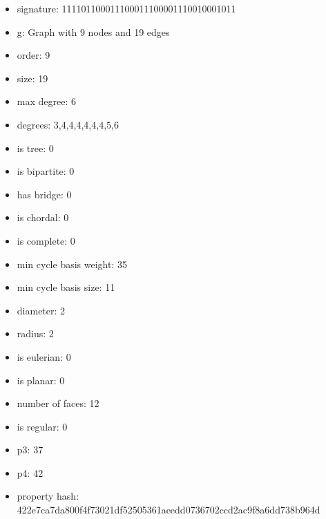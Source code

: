 \newpage
\begin{figure}
\end{figure}
\begin{itemize}
\item signature: 111101100011100011100001110010001011
\item g: Graph with 9 nodes and 19 edges
\item order: 9
\item size: 19
\item max degree: 6
\item degrees: 3,4,4,4,4,4,4,5,6
\item is tree: 0
\item is bipartite: 0
\item has bridge: 0
\item is chordal: 0
\item is complete: 0
\item min cycle basis weight: 35
\item min cycle basis size: 11
\item diameter: 2
\item radius: 2
\item is eulerian: 0
\item is planar: 0
\item number of faces: 12
\item is regular: 0
\item p3: 37
\item p4: 42
\item property hash: 422e7ca7da800f4f73021df52505361aeedd0736702ccd2ac9f8a6dd738b964d
\end{itemize}
